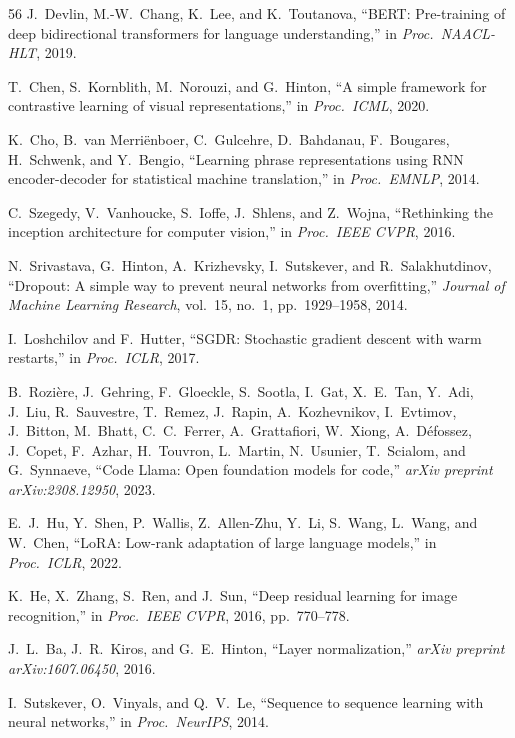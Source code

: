 \documentclass[sigconf,nonacm]{acmart}
\begin{document}
{\begin{thebibliography}{56}
J.~Devlin, M.-W.~Chang, K.~Lee, and K.~Toutanova, ``BERT: Pre-training of deep bidirectional transformers for language understanding,'' in \emph{Proc.\ NAACL-HLT}, 2019.

T.~Chen, S.~Kornblith, M.~Norouzi, and G.~Hinton, ``A simple framework for contrastive learning of visual representations,'' in \emph{Proc.\ ICML}, 2020.

K.~Cho, B.~van Merri\"{e}nboer, C.~Gulcehre, D.~Bahdanau, F.~Bougares, H.~Schwenk, and Y.~Bengio, ``Learning phrase representations using RNN encoder-decoder for statistical machine translation,'' in \emph{Proc.\ EMNLP}, 2014.

C.~Szegedy, V.~Vanhoucke, S.~Ioffe, J.~Shlens, and Z.~Wojna, ``Rethinking the inception architecture for computer vision,'' in \emph{Proc.\ IEEE CVPR}, 2016.

N.~Srivastava, G.~Hinton, A.~Krizhevsky, I.~Sutskever, and R.~Salakhutdinov, ``Dropout: A simple way to prevent neural networks from overfitting,'' \emph{Journal of Machine Learning Research}, vol.~15, no.~1, pp.~1929--1958, 2014.

I.~Loshchilov and F.~Hutter, ``SGDR: Stochastic gradient descent with warm restarts,'' in \emph{Proc.\ ICLR}, 2017.

B.~Rozi\`{e}re, J.~Gehring, F.~Gloeckle, S.~Sootla, I.~Gat, X.~E.~Tan, Y.~Adi, J.~Liu, R.~Sauvestre, T.~Remez, J.~Rapin, A.~Kozhevnikov, I.~Evtimov, J.~Bitton, M.~Bhatt, C.~C.~Ferrer, A.~Grattafiori, W.~Xiong, A.~D\'{e}fossez, J.~Copet, F.~Azhar, H.~Touvron, L.~Martin, N.~Usunier, T.~Scialom, and G.~Synnaeve, ``Code Llama: Open foundation models for code,'' \emph{arXiv preprint arXiv:2308.12950}, 2023.

E.~J.~Hu, Y.~Shen, P.~Wallis, Z.~Allen-Zhu, Y.~Li, S.~Wang, L.~Wang, and W.~Chen, ``LoRA: Low-rank adaptation of large language models,'' in \emph{Proc.\ ICLR}, 2022.

K.~He, X.~Zhang, S.~Ren, and J.~Sun, ``Deep residual learning for image recognition,'' in \emph{Proc.\ IEEE CVPR}, 2016, pp.~770--778.

J.~L.~Ba, J.~R.~Kiros, and G.~E.~Hinton, ``Layer normalization,'' \emph{arXiv preprint arXiv:1607.06450}, 2016.

I.~Sutskever, O.~Vinyals, and Q.~V.~Le, ``Sequence to sequence learning with neural networks,'' in \emph{Proc.\ NeurIPS}, 2014.


\end{thebibliography}}
\end{document}

